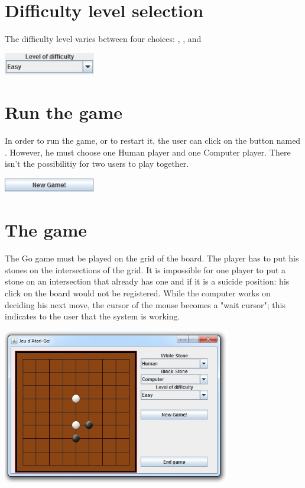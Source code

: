 \documentclass[a4paper,10pt]{report}
\newcommand{\empha}[1]{\textbf{\color{blue}{#1}}}
\begin{document}
		\section{Difficulty level selection}
		The difficulty level varies between four choices: \empha{Very Easy}, \empha{Easy}, \empha{Medium} and \empha{Hard}
			\\
			\begin{center}
				\includegraphics[width=0.30\textwidth] {img/DifficultySelect.jpg}
			\end{center}

		\section{Run the game}
		In order to run the game, or to restart it, the user can click on the button named \empha{New Game}. However, he must choose one Human player and one Computer player. There isn't the possibilitiy for two users to play together.
			\\
			\begin{center}
				\includegraphics[width=0.30\textwidth] {img/NewGame.jpg}
			\end{center}

		\section{The game}
		The Go game must be played on the grid of the board. The player has to put his stones on the intersections of the grid. It is impossible for one player to put a stone on an intersection that already has one and if it is a suicide position: his click on the board would not be registered. While the computer works on deciding his next move, the cursor of the mouse becomes a "wait cursor"; this indicates to the user that the system is working.
			\\
			\begin{center}
				\includegraphics[width=0.75\textwidth] {img/Game.jpg}
			\end{center}
\end{document}
